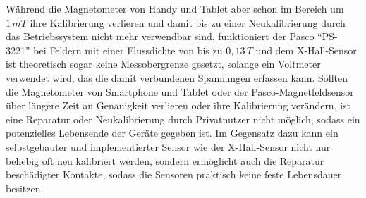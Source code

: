 \documentclass[12pt, a4paper]{article}
\begin{document}
Während die Magnetometer von Handy und Tablet aber schon im Bereich um $1\,mT$ ihre Kalibrierung verlieren und damit bis zu einer Neukalibrierung durch das Betriebssystem nicht mehr verwendbar sind, funktioniert der Pasco ``PS-3221'' bei Feldern mit einer Flussdichte von bis zu $0,13\,T$ und dem X-Hall-Sensor ist theoretisch sogar keine Messobergrenze gesetzt, solange ein Voltmeter verwendet wird, das die damit verbundenen Spannungen erfassen kann.\newline
Sollten die Magnetometer von Smartphone und Tablet oder der Pasco-Magnetfeldsensor über längere Zeit an Genauigkeit verlieren oder ihre Kalibrierung verändern, ist eine Reparatur oder Neukalibrierung durch Privatnutzer nicht möglich, sodass ein potenzielles Lebensende der Geräte gegeben ist.\newline
Im Gegensatz dazu kann ein selbstgebauter und implementierter Sensor wie der X-Hall-Sensor nicht nur beliebig oft neu kalibriert werden, sondern ermöglicht auch die Reparatur beschädigter Kontakte, sodass die Sensoren praktisch keine feste Lebensdauer besitzen. 
\end{document}
